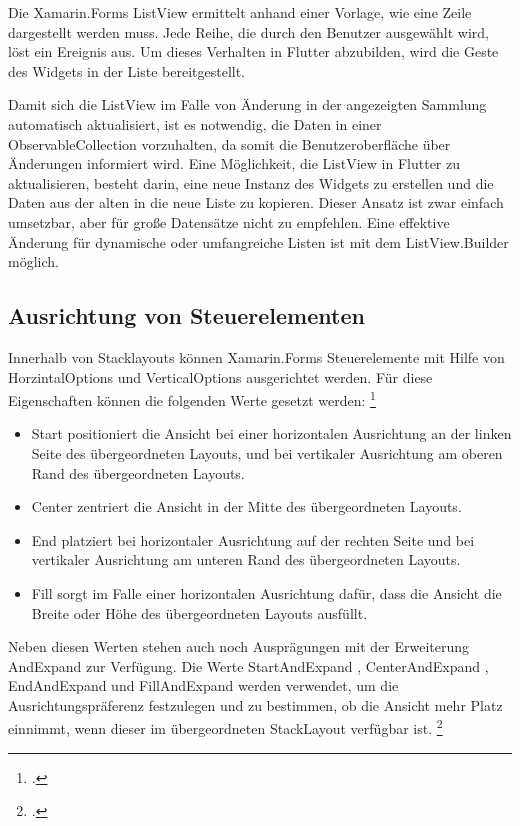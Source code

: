 Die Xamarin.Forms \glq ListView \grq{}ermittelt anhand einer Vorlage,  wie eine Zeile dargestellt werden muss.  Jede Reihe,  die durch den Benutzer ausgewählt wird,  löst ein Ereignis aus.  Um dieses Verhalten in Flutter abzubilden,  wird die Geste des Widgets in der Liste bereitgestellt.  

Damit sich die ListView im Falle von Änderung in der angezeigten Sammlung automatisch aktualisiert, ist es notwendig,  die Daten in einer \glq ObservableCollection\grq{} vorzuhalten,  da somit die Benutzeroberfläche über Änderungen informiert wird.   Eine  Möglichkeit, die  \glq ListView\grq{} in Flutter zu aktualisieren, besteht darin, eine neue Instanz des Widgets zu erstellen und die Daten aus der alten in die neue Liste zu kopieren.  Dieser Ansatz ist zwar einfach umsetzbar, aber für große Datensätze nicht zu empfehlen.  Eine effektive Änderung für dynamische oder umfangreiche Listen ist mit dem ListView.Builder möglich.   

\subsection{Ausrichtung von Steuerelementen}
Innerhalb von \glq Stacklayouts\grq{} können Xamarin.Forms Steuerelemente mit Hilfe von \glq HorzintalOptions\grq{} und \glq VerticalOptions\grq{}  ausgerichtet werden.  Für diese Eigenschaften können die folgenden Werte gesetzt werden: \footcite[Vgl.][Abgerufen am \today]{MicrosoftLayouts2020} 

\begin{itemize}
\setlength\itemsep{-0.6em}
 \item \glq Start\grq{} positioniert die Ansicht bei einer horizontalen Ausrichtung an der linken Seite des übergeordneten Layouts, und bei vertikaler Ausrichtung am oberen Rand des übergeordneten Layouts.
  \item \glq Center\grq{} zentriert die Ansicht in der Mitte des übergeordneten Layouts.
  \item \glq End\grq{} platziert bei horizontaler Ausrichtung auf der rechten Seite und bei vertikaler Ausrichtung  am unteren Rand des übergeordneten Layouts.
  \item \glq Fill\grq{} sorgt im Falle einer horizontalen Ausrichtung dafür, dass die Ansicht die Breite oder Höhe des übergeordneten Layouts ausfüllt.
\end{itemize}
Neben diesen Werten stehen auch noch Ausprägungen mit der Erweiterung \glq AndExpand\grq{} zur Verfügung.  Die Werte \glq StartAndExpand\grq{} , \glq CenterAndExpand\grq{} , \glq EndAndExpand\grq{}  und \glq FillAndExpand\grq{}  werden verwendet, um die Ausrichtungspräferenz festzulegen und zu bestimmen, ob die Ansicht mehr Platz einnimmt, wenn dieser im übergeordneten \glq StackLayout\grq{} verfügbar ist. \footcite[Vgl.][Abgerufen am \today]{MicrosoftLayouts2020} 


